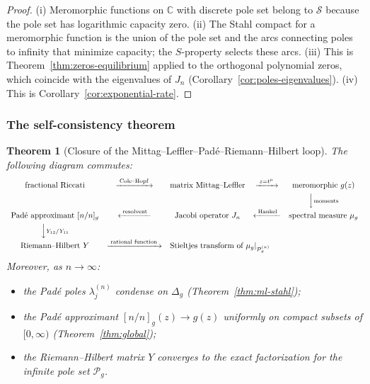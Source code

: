 \documentclass[11pt]{article}
\newtheorem{theorem}{Theorem}[section]
\theoremstyle{definition}
\theoremstyle{remark}
\begin{document}
\begin{proof}
(i) Meromorphic functions on $\mathbb{C}$ with discrete pole set belong to $\mathcal{S}$ because the pole set has logarithmic capacity zero. (ii) The Stahl compact for a meromorphic function is the union of the pole set and the arcs connecting poles to infinity that minimize capacity; the $S$-property selects these arcs. (iii) This is Theorem~\ref{thm:zeros-equilibrium} applied to the orthogonal polynomial zeros, which coincide with the eigenvalues of $J_{n}$ (Corollary~\ref{cor:poles-eigenvalues}). (iv) This is Corollary~\ref{cor:exponential-rate}.
\end{proof}

\subsubsection{The self-consistency theorem}
\label{sec:loop-closure}

\begin{theorem}[Closure of the Mittag--Leffler--Pad\'e--Riemann--Hilbert loop]
\label{thm:loop-closure}
The following diagram commutes:
\begin{equation}
\begin{array}{ccccc}
\text{fractional Riccati}
&\xrightarrow{\;\text{Cole--Hopf}\;}
&\text{matrix Mittag--Leffler}
&\xrightarrow{\;z=t^{\mu}\;}
&\text{meromorphic }g(z)\\[0.4em]
&&&&\Big\downarrow{\scriptstyle\text{moments}}\\[0.4em]
\text{Pad\'e approximant }[n/n]_{g}
&\xleftarrow{\;\text{resolvent}\;}
&\text{Jacobi operator }J_{n}
&\xleftarrow{\;\text{Hankel}\;}
&\text{spectral measure }\mu_{g}\\[0.4em]
\Big\downarrow{\scriptstyle Y_{12}/Y_{11}}\\[0.4em]
\text{Riemann--Hilbert }Y
&\xrightarrow{\;\text{rational function}\;}
&\multicolumn{3}{l}{\text{Stieltjes transform of }\mu_{g}|_{\mathcal{P}_{g}^{(n)}}}
\end{array}
\label{eq:loop-diagram}
\end{equation}
Moreover, as $n\to\infty$:
\begin{itemize}
\item the Pad\'e poles $\lambda_{j}^{(n)}$ condense on $\Delta_{g}$ (Theorem~\ref{thm:ml-stahl});
\item the Pad\'e approximant $[n/n]_{g}(z)\to g(z)$ uniformly on compact subsets of $[0,\infty)$ (Theorem~\ref{thm:global});
\item the Riemann--Hilbert matrix $Y$ converges to the exact factorization for the infinite pole set $\mathcal{P}_{g}$.
\end{itemize}
\end{theorem}
\end{document}
